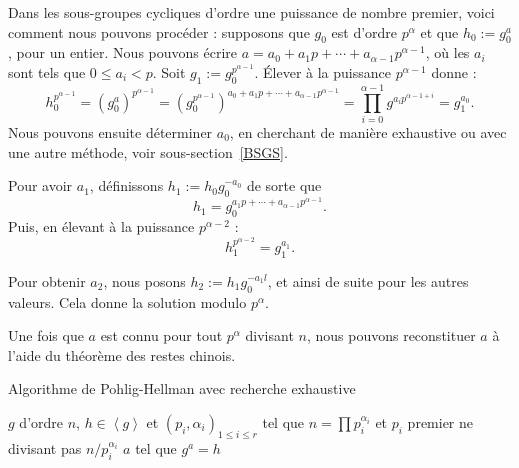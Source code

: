 \documentclass[a4paper, titlepage]{article}
\theoremstyle{definition}
\theoremstyle{remark}
\def\gen #1{\left\langle#1\right\rangle}
\begin{document}
Dans les sous-groupes cycliques d'ordre une puissance de nombre premier, voici comment nous pouvons procéder : supposons que $g_0$ est d'ordre $p^\alpha$ et que $h_0 := g_0^a$, pour un entier. Nous pouvons écrire $a = a_0 + a_1 p + \cdots + a_{\alpha-1}p^{\alpha-1}$, où les $a_i$ sont tels que $0\leqslant a_i < p$. Soit $g_1 := g_0^{p^{\alpha-1}}$. \'Elever à la puissance $p^{\alpha-1}$ donne :
$$h_0^{p^{\alpha-1}} = {(g_0^a)}^{p^{\alpha-1}} = {\left(g_0^{p^{\alpha-1}}\right)}^{a_0 + a_1 p + \cdots + a_{\alpha-1}p^{\alpha-1}} = \prod_{i=0}^{\alpha -1 } g^{a_ip^{\alpha-1+i}} = g_1^{a_0}.$$
Nous pouvons ensuite déterminer $a_0$, en cherchant de manière exhaustive ou avec une autre méthode, voir sous-section~\ref{BSGS}.

Pour avoir $a_1$, définissons $h_1 := h_0g_0^{-a_0}$ de sorte que
$$h_1 = g_0^{a_1 p + \cdots + a_{\alpha-1}p^{\alpha-1}}.$$
Puis, en élevant à la puissance $p^{\alpha-2}$ :
$$h_1^{p^{\alpha-2}} = g_1^{a_1}.$$

Pour obtenir $a_2$, nous posons $h_2 := h_1g_0^{-a_1l}$, et ainsi de suite pour les autres valeurs. Cela donne la solution modulo $p^\alpha$.

Une fois que $a$ est connu pour tout $p^\alpha$ divisant $n$, nous pouvons reconstituer $a$ à l'aide du théorème des restes chinois.

\begin{algorithm}[h]
\caption{Algorithme de Pohlig-Hellman avec recherche exhaustive}
\label{algoPohligHellman}
\begin{algorithmic}[1]
\REQUIRE $g$ d'ordre $n$, $h \in \gen{g}$ et ${(p_i,\alpha_i)}_{1\leqslant i \leqslant r}$ tel que $n = \prod p_i^{\alpha_i}$ et $p_i$ premier ne divisant pas $n/p_i^{\alpha_i}$
\ENSURE $a$ tel que $g^a = h$
			\ENDWHILE
		\ENDIF
	\ENDFOR
\ENDFOR
{}
\end{algorithmic}
\end{algorithm}
\end{document}

